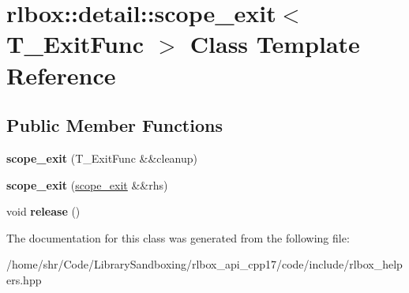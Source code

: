 \hypertarget{classrlbox_1_1detail_1_1scope__exit}{}\section{rlbox\+:\+:detail\+:\+:scope\+\_\+exit$<$ T\+\_\+\+Exit\+Func $>$ Class Template Reference}
\label{classrlbox_1_1detail_1_1scope__exit}
\subsection*{Public Member Functions}
\begin{DoxyCompactItemize}
\item 
\mbox{\label{classrlbox_1_1detail_1_1scope__exit_a4641bf6c373d54990939eff6bc05ef5b}} 
{\bfseries scope\+\_\+exit} (T\+\_\+\+Exit\+Func \&\&cleanup)
\item 
\mbox{\label{classrlbox_1_1detail_1_1scope__exit_a03299473483c9b24c1c9e37f966c06c6}} 
{\bfseries scope\+\_\+exit} (\hyperlink{classrlbox_1_1detail_1_1scope__exit}{scope\+\_\+exit} \&\&rhs)
\item 
\mbox{\label{classrlbox_1_1detail_1_1scope__exit_a632232600d8f56dcccc21c05ebd543fe}} 
void {\bfseries release} ()
\end{DoxyCompactItemize}


The documentation for this class was generated from the following file\+:\begin{DoxyCompactItemize}
\item 
/home/shr/\+Code/\+Library\+Sandboxing/rlbox\+\_\+api\+\_\+cpp17/code/include/rlbox\+\_\+helpers.\+hpp\end{DoxyCompactItemize}
